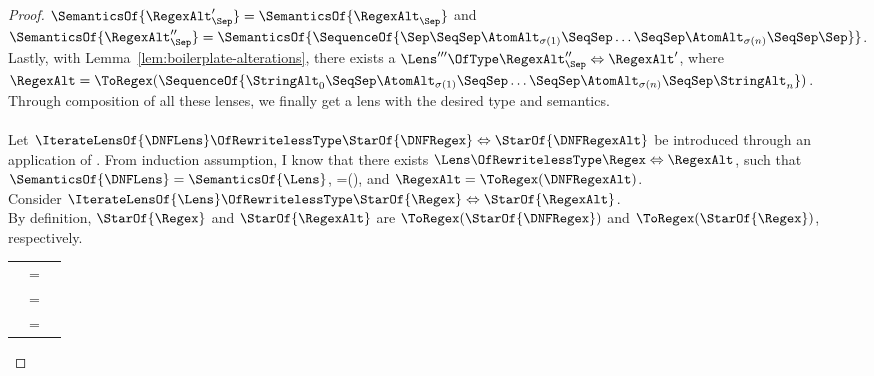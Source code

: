 \documentclass[acmsmall,screen]{acmart}
\begin{document}
\begin{mylemma}
\begin{proof}
    $\SemanticsOf{\RegexAlt_{\Sep}'}=\SemanticsOf{\RegexAlt_{\Sep}}$ and 
    $\SemanticsOf{\RegexAlt_{\Sep}''}=\SemanticsOf{\SequenceOf{\Sep \SeqSep  \AtomAlt_{\sigma(1)}  \SeqSep  \ldots  \SeqSep  \AtomAlt_{\sigma(n)}  \SeqSep  \Sep}}$.
    Lastly, with Lemma~\ref{lem:boilerplate-alterations}, there exists a
    $\Lens''' \OfType \RegexAlt_{\Sep}'' \Leftrightarrow \RegexAlt'$, where
    $\RegexAlt = \ToRegex(\SequenceOf{\StringAlt_0 \SeqSep  \AtomAlt_{\sigma(1)}  \SeqSep  \ldots  \SeqSep  \AtomAlt_{\sigma(n)}  \SeqSep  \StringAlt_n})$.
    Through composition of all these lenses, we finally get a lens with the desired type
    and semantics.\\
    \\
    Let $\IterateLensOf{\DNFLens} \OfRewritelessType \StarOf{\DNFRegex} \Leftrightarrow \StarOf{\DNFRegexAlt}$
    be introduced through an application of \AtomLensRule{}.
    From induction assumption, I know that there exists $\Lens \OfRewritelessType \Regex \Leftrightarrow \RegexAlt$, such that
    $\SemanticsOf{\DNFLens}=\SemanticsOf{\Lens}$,
    \Regex=\ToRegex(\DNFRegex), and
    $\RegexAlt=\ToRegex(\DNFRegexAlt)$.\\
    Consider $\IterateLensOf{\Lens} \OfRewritelessType \StarOf{\Regex} \Leftrightarrow \StarOf{\RegexAlt}$.\\
    By definition, $\StarOf{\Regex}$ and $\StarOf{\RegexAlt}$ are $\ToRegex(\StarOf{\DNFRegex})$
    and $\ToRegex(\StarOf{\Regex})$, respectively.

    \begin{tabular}{vcq}
      \SemanticsOf{\IterateLensOf{\Lens}} & = &
                                                \\
                                          & = &
                                                \\
                                          & = &
                                                \SemanticsOf{\IterateLensOf{\DNFLens}}
    \end{tabular}
  \end{proof}
\end{mylemma}
\end{document}
